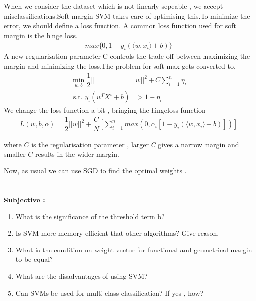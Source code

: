 \documentclass[12pt,a4paper]{article}
\begin{document}
{\section{}
When we consider the dataset which is not linearly sepeable , we accept misclassifications.Soft margin SVM takes care of optimising this.To minimize the error, we should define a loss function. A common loss function used for soft margin is the hinge loss.
\begin{align*}
    max\{0 , 1 - y_i(\langle w,x_i\rangle +b)\}
\end{align*}
A new regularization parameter C controls the trade-off between maximizing the margin and minimizing the loss.The problem for soft max gets converted to,
\begin{align*}
    \min_{w,b} \dfrac{1}{2}||&w||^2 + C\sum_{i = 1}^n \eta_i \\ 
    \text{    s.t.   }  y_i(w^{T}X^i + b) &> 1 - \eta_i
\end{align*}
We change the loss function a bit , bringing the hingeloss function
\begin{align*}
    L(w,b,\alpha) = \dfrac{1}{2}||w||^2 + \dfrac{C}{N}\left[\sum_{i=1}^n max (0 ,\alpha_i [1 - y_i(\langle w,x_i\rangle +b)] )\right]
\end{align*}

where $C$ is the regularisation parameter , larger $C$ gives a narrow margin and smaller $C$ results in the wider margin.

Now, as usual we can use SGD to find the optimal weights .
\section{}

\textbf{Subjective : }
\begin{enumerate}
    \item What is the significance of the threshold term b?
    \item  Is SVM more memory efficient that other algorithms? Give reason.
    \item What is the condition on weight vector for functional and geometrical
margin to be equal?
    \item What are the disadvantages of using SVM?
    \item Can SVMs be used for multi-class classification? If yes , how?\\[10pt]
\end{enumerate}


}
\end{document}
